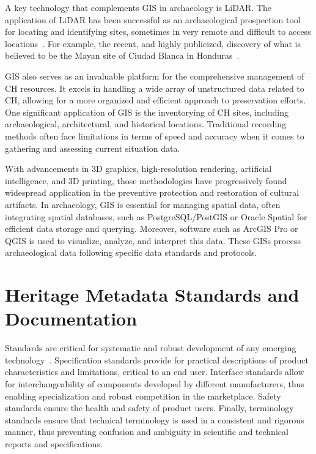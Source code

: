 A key technology that complements \gls{GIS} in archaeology is \gls{LiDAR}. 
The application of \gls{LiDAR} has been successful as an archaeological prospection tool for locating and identifying
sites, sometimes in very remote and difficult to access locations~\cite{article_lidar}. For example, the recent, and highly publicized, 
discovery of what is believed to be the Mayan site of Ciudad Blanca in Honduras~\cite{Tolley2012}.

\gls{GIS} also serves as an invaluable platform for the comprehensive management of \gls{CH} resources. It excels in handling a wide array of
unstructured data related to \gls{CH}, allowing for a more organized and efficient approach to preservation efforts. One significant 
application of \gls{GIS} is the inventorying of \gls{CH} sites, including archaeological, architectural, and historical locations. Traditional recording methods often face limitations in terms of speed and accuracy when
it comes to gathering and assessing current situation data.

With advancements in \gls{3D} graphics, high-resolution rendering, artificial intelligence, and \gls{3D} printing, those methodologies have progressively found widespread application in the preventive protection and restoration of cultural artifacts. 
In archaeology, \gls{GIS} is essential for managing spatial data, often integrating spatial databases, such as PostgreSQL/PostGIS or Oracle Spatial for efficient data storage and querying.
Moreover, software such as ArcGIS Pro or QGIS is used to visualize, analyze, and interpret this data. These \glspl{GIS} process archaeological data following specific data standards and protocols.

\section{Heritage Metadata Standards and Documentation} 
\label{sub:standart}

Standards are critical for systematic and robust development of any emerging technology~\cite{hale2014handbook}.
Specification standards provide for practical descriptions of product characteristics and limitations, 
critical to an end user. Interface standards allow for interchangeability of components developed by 
different manufacturers, thus enabling specialization and robust competition in the marketplace. 
Safety standards ensure the health and safety of product users. Finally, terminology standards ensure that 
technical terminology is used in a consistent and rigorous manner, thus preventing confusion and 
ambiguity in scientific and technical reports and specifications.

